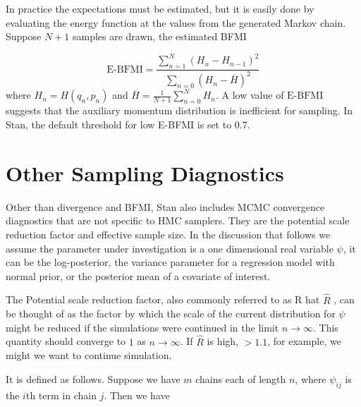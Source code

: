 \documentclass[12pt]{report}
\begin{document}
 In practice the expectations must be estimated, but
it is easily done by evaluating the energy function at the values from the
generated Markov chain. Suppose $N+1$ samples are drawn, the estimated BFMI 

\[ \text{E-BFMI} = \frac{\sum_{n=1}^N(H_n-H_{n-1})^2}{\sum_{n=0}(H_n-\bar{H})^2} \]
where $H_n = H(q_n,p_n)$ and $\overline{H}=\frac{1}{N+1}\sum_{n=0}^N H_n$. A low value of $\text{E-BFMI}$ suggests that the auxiliary momentum distribution is
inefficient for sampling. In Stan, the default threshold for low E-BFMI is set to 0.7.

 
\section{Other Sampling Diagnostics}

Other than divergence and BFMI, Stan also includes MCMC convergence diagnostics that are not specific to HMC samplers. They are the potential scale reduction factor and effective sample size. In the discussion that follows we assume the parameter under investigation is a one dimensional real variable $\psi$, it can be the log-posterior, the variance parameter for a regression model with normal prior, or the posterior mean of a covariate of interest.


The Potential scale reduction factor, also commonly referred to as R hat $\hat{R}$ , can be thought of as the factor by which the scale of the current distribution for $\psi$ might be reduced if the simulations were continued in the limit $n \rightarrow \infty$. This quantity should converge to $1$ as $n \rightarrow \infty$. If $\hat{R}$ is high, $ > 1.1 $, for example, we might we want to continue simulation. 

It is defined as follows. Suppose we have $m$ chains each of length $n$, where $\psi_{ij}$ is the $i$th term in chain $j$. Then we have 
\end{document}

